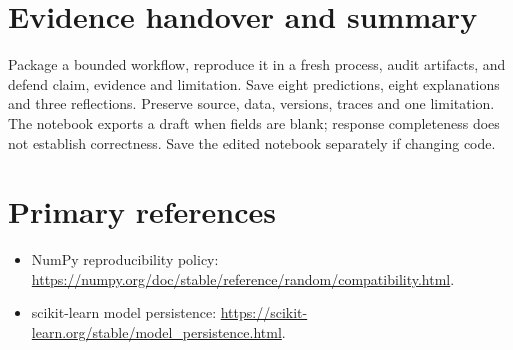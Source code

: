 \section{Evidence handover and summary}
Package a bounded workflow, reproduce it in a fresh process, audit artifacts, and defend claim, evidence and limitation. Save eight predictions, eight explanations and three reflections. Preserve source, data, versions, traces and one limitation. The notebook exports a draft when fields are blank; response completeness does not establish correctness. Save the edited notebook separately if changing code.
\section{Primary references}
\begin{itemize}
\item NumPy reproducibility policy: \url{https://numpy.org/doc/stable/reference/random/compatibility.html}.
\item scikit-learn model persistence: \url{https://scikit-learn.org/stable/model_persistence.html}.
\end{itemize}
